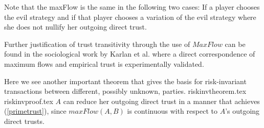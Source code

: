   \noindent Note that the maxFlow is the same in the following two cases: If a player chooses the evil strategy and if that
  player chooses a variation of the evil strategy where she does not nullify her outgoing direct trust.

  Further justification of trust transitivity through the use of $MaxFlow$ can be found in the sociological work by Karlan et
  al. \cite{kmrs} where a direct correspondence of maximum flows and empirical trust is experimentally validated.

  Here we see another important theorem that gives the basis for risk-invariant transactions between different, possibly
  unknown, parties.
  {riskinvtheorem.tex}
  {riskinvproof.tex}
  \noindent $A$ can reduce her outgoing direct trust in a manner that achieves (\ref{primetrust}), since
  $maxFlow\left(A, B\right)$ is continuous with respect to $A$'s outgoing direct trusts.
